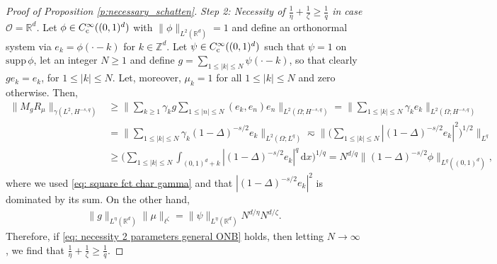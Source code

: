 \documentclass[reqno]{amsart}
\theoremstyle{plain}
\theoremstyle{remark}
\theoremstyle{plain}
\numberwithin{equation}{section}
\newcommand\bZ{\mathbb{Z}}
\newcommand\cO{\mathcal{O}}
\def\R{{\mathbb R}}
\newcommand{\di}{\mathrm{d}}
\newcommand{\1}{\one}
\newcommand{\supp}{\mathrm{supp}\,}
\begin{document}
\begin{proof}[Proof of Proposition \ref{p:necessary_schatten}]
\emph{Step 2: Necessity of $\frac{1}{\eta} + \frac{1}{\zeta}\geq \frac1q$ in case $\cO=\R^d$.}
    Let $\phi\in C^\infty_{{\rm c}}((0,1)^d)$ with $\|\phi\|_{L^2(\R^d)}=1$ and define an orthonormal system via $e_k = \phi(\cdot -k)$ for $k\in \bZ^d$. Let $\psi\in C^\infty_{{\rm c}}((0,1)^d)$ such that $\psi = 1$ on $\supp \phi$, let an integer $N\geq 1$ and define $g = \sum_{1\leq |k| \leq N} \psi(\cdot-k)$, so that clearly $ge_k = e_k$, for $1\leq |k|\leq N$. Let, moreover, $\mu_k = 1$ for all $1\leq |k|\leq N$ and zero otherwise.
    Then, 
    \begin{align*}
    \|M_g R_\mu \|_{\gamma(L^2,H^{-s,q})}  
    &\geq \Big\|\sum_{k\geq 1}\gamma_k g\sum_{1\leq |n|\leq N}(e_k,e_n)e_n \Big\|_{L^2(\Omega;H^{-s,q})} 
    = \Big\|\sum_{1\leq |k|\leq N}\gamma_k e_k \Big\|_{L^2(\Omega;H^{-s,q})} 
    \\& = \Big\|\sum_{1\leq |k|\leq N}\gamma_k (1-\Delta)^{-s/2} e_k \Big\|_{L^2(\Omega;L^q)} 
     \eqsim \Big\|\Big(\sum_{1\leq |k|\leq N} |(1-\Delta)^{-s/2} e_k|^2 \Big)^{1/2}\Big\|_{L^q} 
    \\& \geq \Big(\sum_{1\leq |k|\leq N} \int_{(0,1)^d+k} |(1-\Delta)^{-s/2} e_k|^q \,\di x\Big)^{1/q}
     =N^{d/q} \|(1-\Delta)^{-s/2}\phi\|_{L^{q}((0,1)^d)} ,
    \end{align*}
    where we used \eqref{eq: square fct char gamma} and that 
       $|(1-\Delta)^{-s/2}e_k|^2$ is dominated by its sum.
    On the other hand,
\begin{align*}
\|g\|_{L^{\eta}(\R^d)} \|\mu\|_{\ell^\zeta} =\|\psi\|_{L^{\eta}(\R^d)} N^{d/\eta} N^{d/\zeta}. 
\end{align*}
Therefore, if \eqref{eq: necessity 2 parameters general ONB} holds, then letting $N\to \infty$, we find that $\frac{1}{\eta} + \frac{1}{\zeta}\geq \frac1q$. 
\end{proof}
\end{document}
